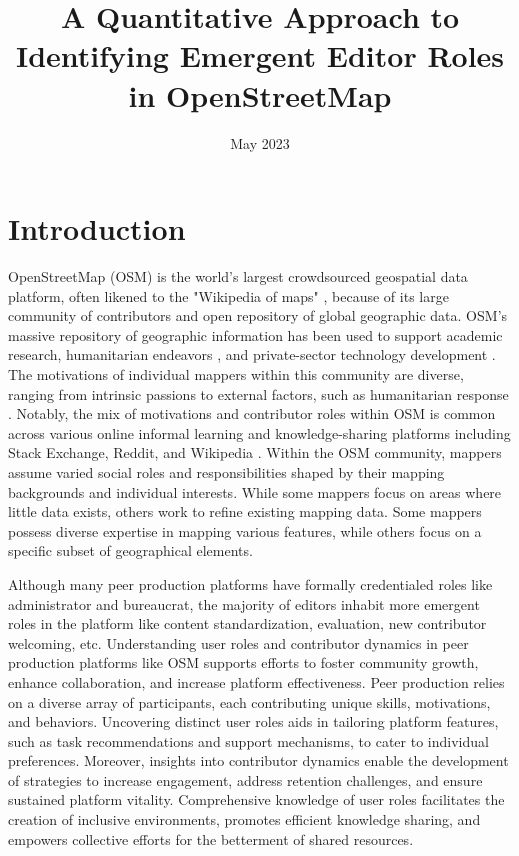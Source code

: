 \documentclass[manuscript,screen,review]{acmart}
\title{A Quantitative Approach to Identifying Emergent Editor Roles in OpenStreetMap}
\date{May 2023}
\begin{document}
\maketitle

\section{Introduction}

OpenStreetMap (OSM) is the world's largest crowdsourced geospatial data platform, often likened to the "Wikipedia of maps" \cite{steve11}, because of its large community of contributors and open repository of global geographic data. OSM's massive repository of geographic information has been used to support academic research, humanitarian endeavors \cite{soden2014crowdsourced}, and private-sector technology development \cite{Anderson19}. The motivations of individual mappers within this community are diverse, ranging from intrinsic passions to external factors, such as humanitarian response \cite{Budhathoki13}. Notably, the mix of motivations and contributor roles within OSM is common across various online informal learning and knowledge-sharing platforms including Stack Exchange, Reddit, and Wikipedia \cite{Saxena21}. Within the OSM community, mappers assume varied social roles and responsibilities shaped by their mapping backgrounds and individual interests. While some mappers focus on areas where little data exists, others work to refine existing mapping data. Some mappers possess diverse expertise in mapping various features, while others focus on a specific subset of geographical elements. 

Although many peer production platforms have formally credentialed roles like administrator and bureaucrat, the majority of editors inhabit more emergent roles in the platform like content standardization, evaluation, new contributor welcoming, etc. \cite{Keegan15} Understanding user roles and contributor dynamics in peer production platforms like OSM supports efforts to foster community growth, enhance collaboration, and increase platform effectiveness\cite{Saxena21}. Peer production relies on a diverse array of participants, each contributing unique skills, motivations, and behaviors\cite{Saxena21}. Uncovering distinct user roles aids in tailoring platform features, such as task recommendations and support mechanisms, to cater to individual preferences\cite{hot_task_manager,maproulette}. Moreover, insights into contributor dynamics enable the development of strategies to increase engagement, address retention challenges, and ensure sustained platform vitality. Comprehensive knowledge of user roles facilitates the creation of inclusive environments, promotes efficient knowledge sharing, and empowers collective efforts for the betterment of shared resources.
\end{document}
